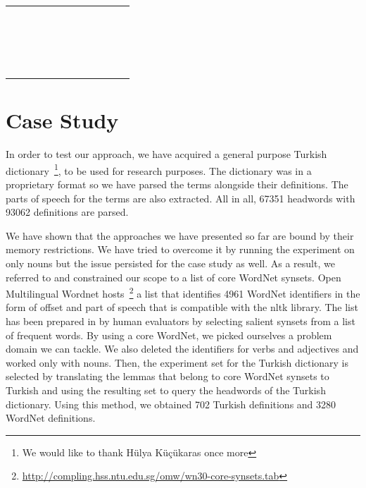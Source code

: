 \begin{table}[]
\begin{tabular}{@{}lllllllllll@{}}
 &  &  &  &  &  &  &  &  &  &  \\
 &  &  &  &  &  &  &  &  &  &  \\
 &  &  &  &  &  &  &  &  &  &  \\
 &  &  &  &  &  &  &  &  &  &  \\
 &  &  &  &  &  &  &  &  &  &  \\
 &  &  &  &  &  &  &  &  &  &  \\
 &  &  &  &  &  &  &  &  &  &  \\
 &  &  &  &  &  &  &  &  &  &  \\
 &  &  &  &  &  &  &  &  &  &  \\
 &  &  &  &  &  &  &  &  &  &  \\
 &  &  &  &  &  &  &  &  &  &  \\
 &  &  &  &  &  &  &  &  &  &  \\
 &  &  &  &  &  &  &  &  &  &  \\
 &  &  &  &  &  &  &  &  &  &  \\
 &  &  &  &  &  &  &  &  &  &  \\
 &  &  &  &  &  &  &  &  &  &  \\
 &  &  &  &  &  &  &  &  &  &  \\ \cmidrule(r){1-2}
\end{tabular}
\end{table}


\section{Case Study}%
\label{sec:case_study}

In order to test our approach, we have acquired a general purpose Turkish dictionary~\footnote{We would like to thank Hülya Küçükaras once more}, to be used for research purposes.
The dictionary was in a proprietary format so we have parsed the terms alongside their definitions.
The parts of speech for the terms are also extracted.
All in all, 67351 headwords with 93062 definitions are parsed.

We have shown that the approaches we have presented so far are bound by their memory restrictions.
We have tried to overcome it by running the experiment on only nouns but the issue persisted for the case study as well.
As a result, we referred to \textcite{khodak_automated_2017} and constrained our scope to a list of core WordNet synsets.
Open Multilingual Wordnet hosts~\footnote{\url{http://compling.hss.ntu.edu.sg/omw/wn30-core-synsets.tab}} a list that identifies 4961 WordNet identifiers in the form of offset and part of speech that is compatible with the nltk library.
The list has been prepared in \textcite{boyd-graber_adding_2006} by human evaluators by selecting salient synsets from a list of frequent words.
By using a core WordNet, we picked ourselves a problem domain we can tackle.
We also deleted the identifiers for verbs and adjectives and worked only with nouns.
Then, the experiment set for the Turkish dictionary is selected by translating the lemmas that belong to core WordNet synsets to Turkish and using the resulting set to query the headwords of the Turkish dictionary.
Using this method, we obtained 702 Turkish definitions and 3280 WordNet definitions.

